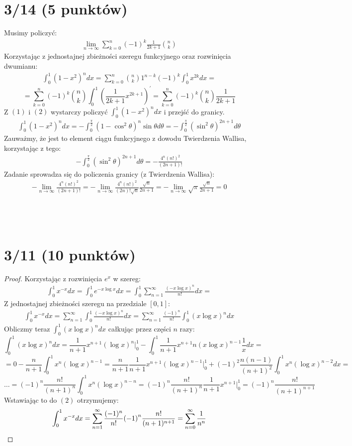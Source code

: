 \documentclass{article}
\title{}
\date{19.03.2020}
\author{Maurycy Borkowski}
\newcommand \eq[1]{\begin{equation} \begin{split}  #1 \end{split} \end{equation}}
\begin{document}
\maketitle

\section{3/14 (5 punktów)}
Musimy policzyć:
\eq{\lim_{n\to\infty} \sum_{k=0}^{n} {(-1)}^{k} \frac{1}{2k+1} {n\choose k} }
Korzystając z jednostajnej zbieżności szeregu funkcyjnego oraz rozwinięcia dwumianu:
\eq{\int_0^1 {(1-x^2)}^n dx = \sum_{k=0}^{n} {n\choose k} 1^{n-k} {(-1)}^k \int_0^1 x^{2k} dx = }
$$=  \sum_{k=0}^{n} {(-1)}^k {n\choose k} \int_0^1 \left(\frac{1}{2k + 1} x^{2k+1}\right)^\prime = \sum_{k=0}^{n} {(-1)}^k {n\choose k} \frac{1}{2k + 1}$$
Z $(1)$ i $(2)$ wystarczy policzyć $\int_0^1 {(1-x^2)}^n dx$ i przejść do granicy.
\eq{\int_0^1 {(1-x^2)}^n dx = - \int_0^{\frac{\pi}{2}} {(1-\cos ^2 {\theta})}^n \sin{\theta} d\theta = -\int_0^{\frac{\pi}{2}} {(\sin ^2 \theta)}^{2n+1} d\theta}
Zauważmy, że jest to element ciągu funkcyjnego z dowodu Twierdzenia Wallisa, korzystając z tego:
\eq{-\int_0^{\frac{\pi}{2}} {(\sin ^2 \theta)}^{2n+1} d\theta = -\frac{4^n(n!)^2}{(2n + 1)!}}
Zadanie sprowadza się do policzenia granicy (z Twierdzenia Wallisa):
\eq{- \lim_{n\to\infty} \frac{4^n(n!)^2}{(2n + 1)!} = -\lim_{n\to\infty} \frac{4^n(n!)^2}{(2n)! \sqrt{n}} \frac{\sqrt{n}}{2n+1} = -\lim_{n\to\infty} \sqrt{\pi} \frac{\sqrt{n}}{2n+1} = 0}
\\\\\\
\section{3/11 (10 punktów)}
\begin{proof}
Korzystając z rozwinięcia $e^x$ w szereg:
\eq{\int_0^1 x^{-x}dx = \int_0^1 e^{-x\log x}dx = \int_0^1 \sum_{n=1}^{\infty} \frac{{(-x\log x)}^n}{n!}dx =}
Z jednostajnej zbieżności szeregu na przedziale $[0,1]$:
\eq{\int_0^1 x^{-x}dx =\sum_{n=1}^{\infty} \int_0^1 \frac{{(-x\log x)}^n}{n!}dx = \sum_{n=1}^{\infty} \frac{(-1)^n}{n!} \int_0^1 {(x\log x)}^n dx}
Obliczmy teraz $\int_0^1 {(x\log x)}^n dx$ całkując przez części $n$ razy:
$$\int_0^1 {(x\log x)}^n dx = \frac{1}{n + 1}x^{n+1}(\log x)^n\Biggr|_{0}^{1} -\int_0^1 {\frac{1}{n+1} x^{n+1} {n(x\log x)}^{n-1}\frac{1}{x} dx} =$$
$$= 0 - \frac{n}{n+1}\int_0^1 x^n (\log x)^{n-1}  = \frac{n}{n+1}\frac{1}{n + 1}x^{n+1}(\log x)^{n-1}\Biggr|_{0}^{1} + {(-1)}^2 \frac{n(n-1)}{{(n+1)^2}}\int_0^1 x^n (\log x)^{n-2}dx = $$ 
$$\dots = {(-1)}^n \frac{n!}{(n+1)^n}\int_0^1 x^n (\log x)^{n-n} = {(-1)}^n \frac{n!}{(n+1)^n}\frac{1}{n+1}x^{n+1}\Biggr|_{0}^{1} = {(-1)}^n \frac{n!}{(n+1)^{n+1}}$$
Wstawiając to do $(2)$ otrzymujemy:
\eq{\int_0^1 x^{-x}dx = \sum_{n=1}^{\infty} \frac{(-1)^n}{n!} {(-1)}^n \frac{n!}{(n+1)^{n+1}} = \sum_{n=0}^{\infty} \frac{1}{n^n}\qedhere}

\end{proof}
\end{document}
